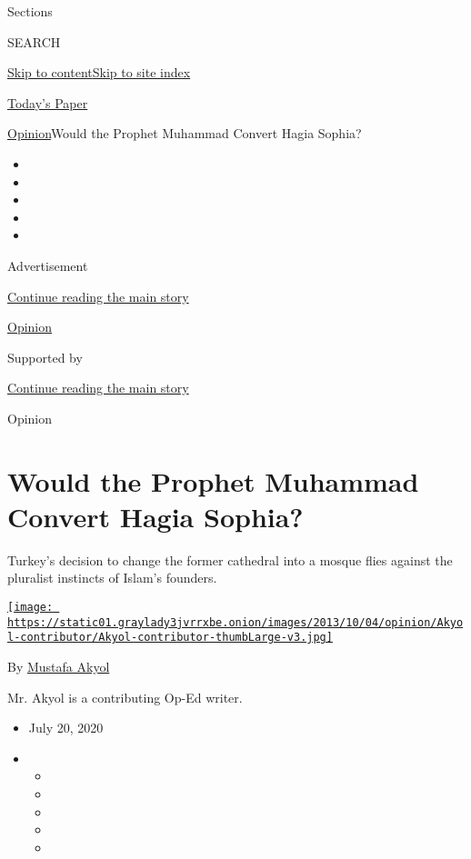 Sections

SEARCH

\protect\hyperlink{site-content}{Skip to
content}\protect\hyperlink{site-index}{Skip to site index}

\href{https://myaccount.nytimes3xbfgragh.onion/auth/login?response_type=cookie\&client_id=vi}{}

\href{https://www.nytimes3xbfgragh.onion/section/todayspaper}{Today's
Paper}

\href{/section/opinion}{Opinion}\textbar{}Would the Prophet Muhammad
Convert Hagia Sophia?

\begin{itemize}
\item
\item
\item
\item
\item
\end{itemize}

Advertisement

\protect\hyperlink{after-top}{Continue reading the main story}

\href{/section/opinion}{Opinion}

Supported by

\protect\hyperlink{after-sponsor}{Continue reading the main story}

Opinion

\hypertarget{would-the-prophet-muhammad-convert-hagia-sophia}{%
\section{Would the Prophet Muhammad Convert Hagia
Sophia?}\label{would-the-prophet-muhammad-convert-hagia-sophia}}

Turkey's decision to change the former cathedral into a mosque flies
against the pluralist instincts of Islam's founders.

\href{https://topics.nytimes3xbfgragh.onion/top/reference/timestopics/people/a/mustafa_akyol/index.html}{\texttt{[image: https://static01.graylady3jvrrxbe.onion/images/2013/10/04/opinion/Akyol-contributor/Akyol-contributor-thumbLarge-v3.jpg]}}

By
\href{https://topics.nytimes3xbfgragh.onion/top/reference/timestopics/people/a/mustafa_akyol/index.html}{Mustafa
Akyol}

Mr. Akyol is a contributing Op-Ed writer.

\begin{itemize}
\item
  July 20, 2020
\item
  \begin{itemize}
  \item
  \item
  \item
  \item
  \item
  \end{itemize}
\end{itemize}

